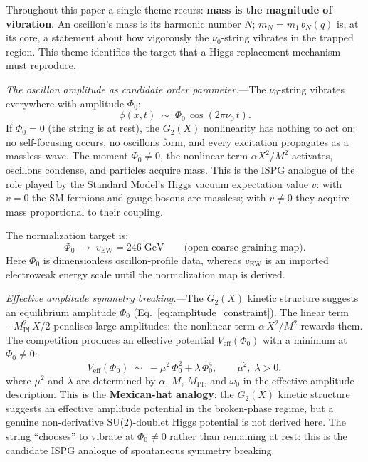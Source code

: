 \documentclass[11pt]{article}
\begin{document}
\medskip
Throughout this paper a single theme recurs:
\textbf{mass is the magnitude of vibration}.
An oscillon's mass is its harmonic number $N$;
$m_N = m_1\,b_N(q)$ is, at its core, a
statement about how vigorously the
$\nu_0$-string vibrates in the trapped region.
This theme identifies the target that a Higgs-replacement
mechanism must reproduce.

\textit{The oscillon amplitude as candidate order
parameter.}---The $\nu_0$-string
vibrates everywhere with amplitude $\Phi_0$:
\begin{equation}\label{eq:higgs_vev}
  \phi(x,t) \;\sim\;
  \Phi_0\,\cos(2\pi\nu_0\,t).
\end{equation}
If $\Phi_0 = 0$ (the string is at rest), the
$G_2(X)$ nonlinearity has nothing to act on:
no self-focusing occurs, no oscillons form,
and every excitation propagates as a massless
wave.  The moment $\Phi_0 \neq 0$, the
nonlinear term $\alpha X^2/M^2$ activates,
oscillons condense, and particles acquire mass.
This is the ISPG analogue of the role played by the
Standard Model's Higgs vacuum expectation value $v$:
with $v = 0$ the SM fermions and gauge bosons are
massless; with $v \neq 0$ they acquire mass
proportional to their coupling.

The normalization target is:
\begin{equation}\label{eq:higgs_map}
\boxed{
  \Phi_0
  \;\longrightarrow\;
  v_{\mathrm{EW}} = 246\;\text{GeV}
  \qquad
  \text{(open coarse-graining map)}.
}
\end{equation}
\noindent
Here $\Phi_0$ is dimensionless oscillon-profile data,
whereas $v_{\mathrm{EW}}$ is an imported electroweak
energy scale until the normalization map is derived.

\textit{Effective amplitude symmetry breaking.}---The
$G_2(X)$ kinetic structure suggests an equilibrium
amplitude $\Phi_0$
(Eq.~\ref{eq:amplitude_constraint}).
The linear term
$-M_{\mathrm{Pl}}^2\,X/2$ penalises large
amplitudes; the nonlinear term
$\alpha\,X^2/M^2$ rewards them.  The
competition produces an effective potential
$V_{\mathrm{eff}}(\Phi_0)$ with a minimum
at $\Phi_0 \neq 0$:
\[
  V_{\mathrm{eff}}(\Phi_0)
  \;\sim\;
  -\mu^2\,\Phi_0^2
  + \lambda\,\Phi_0^4,
  \qquad
  \mu^2,\;\lambda > 0,
\]
where $\mu^2$ and $\lambda$ are determined by
$\alpha$, $M$, $M_{\mathrm{Pl}}$, and
$\omega_0$ in the effective amplitude description.
This is the \textbf{Mexican-hat analogy}: the
$G_2(X)$ kinetic structure suggests an effective
amplitude potential in the broken-phase regime, but a
genuine non-derivative SU(2)-doublet Higgs potential is
not derived here.
The string ``chooses'' to vibrate at $\Phi_0
\neq 0$ rather than remaining at rest:
this is the candidate ISPG analogue of spontaneous
symmetry breaking.
\end{document}

